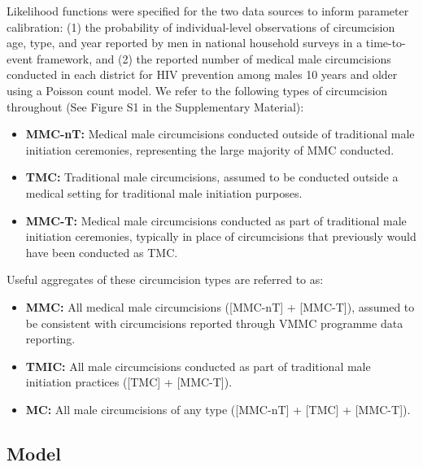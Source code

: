 \documentclass{article}
\begin{document}
Likelihood functions were specified for the two data sources to inform parameter calibration: (1) the probability of individual-level observations of circumcision age, type, and year reported by men in national household surveys in a time-to-event framework, and (2) the reported number of medical male circumcisions conducted in each district for HIV prevention among males 10 years and older using a Poisson count model. We refer to the following types of circumcision throughout (See Figure S1 in the Supplementary Material):
\begin{itemize}
    \item \textbf{MMC-nT:} Medical male circumcisions conducted outside of traditional male initiation ceremonies, representing the large majority of MMC conducted.
    \item \textbf{TMC:} Traditional male circumcisions, assumed to be conducted outside a medical setting for traditional male initiation purposes.
    \item \textbf{MMC-T:} Medical male circumcisions conducted as part of traditional male initiation ceremonies, typically in place of circumcisions that previously would have been conducted as TMC.
\end{itemize}
Useful aggregates of these circumcision types are referred to as:
\begin{itemize}
    \item \textbf{MMC:} All medical male circumcisions ([MMC-nT] + [MMC-T]), assumed to be consistent with circumcisions reported through VMMC programme data reporting.
    \item \textbf{TMIC:} All male circumcisions conducted as part of traditional male initiation practices ([TMC] + [MMC-T]).
    \item \textbf{MC:} All male circumcisions of any type ([MMC-nT] + [TMC] + [MMC-T]).
\end{itemize}


\subsection*{Model}
\label{sec::model}

\end{document}
